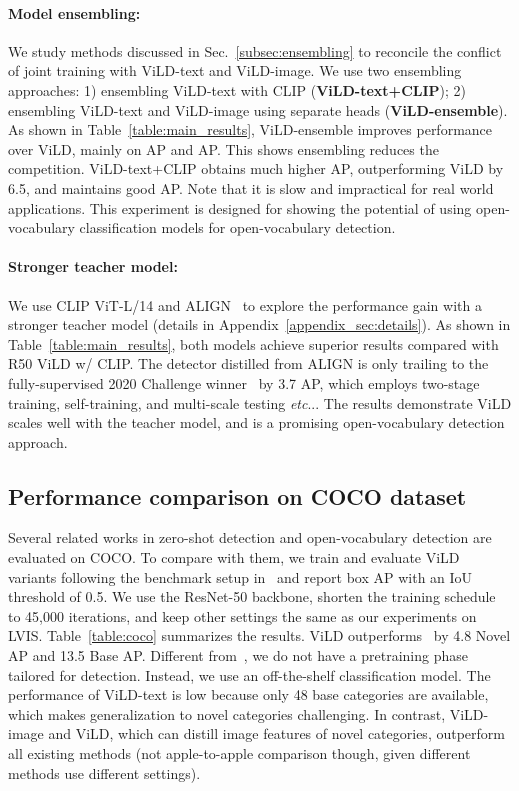 \documentclass{article} \usepackage{iclr2022_conference,times}
\makeatletter
\def\vs{{\bm{s}}}
\DeclareRobustCommand\onedot{\futurelet\@let@token\@onedot}
\def\@onedot{\ifx\@let@token.\else.\null\fi\xspace}
\def\etc{\emph{etc}\onedot} \def\vs{\emph{vs}\onedot}
\makeatother
\begin{document}
\paragraph{Model ensembling: }
 We study methods discussed in Sec.~\ref{subsec:ensembling} to reconcile the conflict of joint training with ViLD-text and ViLD-image. We use two ensembling approaches: 1) ensembling ViLD-text with CLIP (\textbf{ViLD-text+CLIP}); 2) ensembling ViLD-text and ViLD-image using separate heads (\textbf{ViLD-ensemble}).
 As shown in Table~\ref{table:main_results}, ViLD-ensemble improves performance over ViLD, mainly on AP and AP. This shows ensembling reduces the competition. ViLD-text+CLIP obtains much higher AP, outperforming ViLD by 6.5, and maintains good AP. Note that it is slow and impractical for real world applications. This experiment is designed for showing the potential of using open-vocabulary classification models for open-vocabulary detection.


\paragraph{Stronger teacher model:} We use CLIP ViT-L/14 and ALIGN~\citep{align} to explore the performance gain with a stronger teacher model 
(details in Appendix~\ref{appendix_sec:details}). As shown in Table~\ref{table:main_results}, both models achieve superior results compared with R50 ViLD w/ CLIP. The detector distilled from ALIGN is only trailing to the fully-supervised 2020 Challenge winner~\citep{huang2020joint} by 3.7 AP, which employs two-stage training, self-training, and multi-scale testing \etc. The results demonstrate ViLD scales well with the teacher model, and is a promising open-vocabulary detection approach.



\subsection{Performance comparison on COCO dataset}
Several related works in zero-shot detection and open-vocabulary detection are evaluated on COCO.
To compare with them, we train and evaluate ViLD variants following the benchmark setup in~\citet{zareian2021openvocabulary} and report box AP with an IoU threshold of 0.5. We use the ResNet-50 backbone, shorten the training schedule to 45,000 iterations, and keep other settings the same as our experiments on LVIS.
Table~\ref{table:coco} summarizes the results.
ViLD outperforms~\citet{zareian2021openvocabulary} by 4.8 Novel AP and 13.5 Base AP. Different from~\citet{zareian2021openvocabulary}, we do not have a pretraining phase tailored for detection. Instead, we use an off-the-shelf classification model. The performance of ViLD-text is low because only 48 base categories are available, which makes generalization to novel categories challenging. In contrast, ViLD-image and ViLD, which can distill image features of novel categories, outperform all existing methods (not apple-to-apple comparison though, given different methods use different settings).
\end{document}
